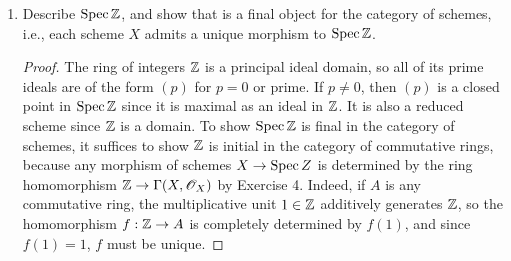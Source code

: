 \documentclass{article}
\begin{document}
\begin{enumerate} [label=\textbf{\arabic*.}, leftmargin=0em]
\begin{proof}
    We want to show the homomorphism between global sections $A \to \Gamma(X, \fO_X)$ completely determines the morphism $f : X \to \spec{B}$. We can check this locally on $X$. Let $V = \spec{B}$ be an open affine subset of $X$. We also have a homomorphism of global sections $A \to \Gamma(V, \fO_X) = B$ by composing with the inclusion morphism, which fits into the following commutative diagram
    \[ \begin{tikzcd}
        & {\Gamma(X, \fO_X)} \arrow[rd] &                               \\
A \arrow[ru] \arrow[rr] &                               & {\Gamma(\spec{B}, \fO_X) = B}
    \end{tikzcd} \]
    where $\Gamma(X, \fO_X) \to B$ is the natural restriction homomorphism. By equivalence of the category of rings and affine schemes, we conclude that $\alpha$ is injective.

    It remains to show $\alpha$ is surjective. Let $\varphi : A \to \Gamma(X, \fO_X)$ be a homomorphism of global sections. For each $x \in X$, let $\goth{m}_x$ be the maximal ideal of $\fO_{x, X}$, and let $i_x : \Gamma(X, \fO_X) \to \fO_{x, X}$ be the natural map. Then define $\tilde{\varphi} : X \to \spec{A}$ by $x \mapsto (i_x \circ \varphi)^{-1}(\goth{m}_x)$. This coincides with the case when $X$ is affine. Indeed, suppose $X = \spec{B}$ for some ring $B$, and let $\goth{p} \in \spec{B}$ corresponding to $x$. The inclusion homeomorphism $i_x : \Gamma(X, \fO_X) \to \fO_{x, X}$ is precisely the natural map $i_\goth{p} : B \to B_\goth{p}$ associated to localization. Thus, $i_x(\gm_x) = \goth{p} \in B$, and $\tilde{\varphi}(x) = \varphi^{-1}(\goth{p})$.
\end{proof}

\item Describe $\operatorname{Spec}{\mathbb{Z}}$, and show that is a final object for the category of schemes, i.e., each scheme $X$ admits a unique morphism to $\operatorname{Spec}{\mathbb{Z}}$.

\begin{proof}
    The ring of integers $\mathbb{Z}$ is a principal ideal domain, so all of its prime ideals are of the form $(p)$ for $p = 0$ or prime. If $p \neq 0$, then $(p)$ is a closed point in $\operatorname{Spec}{\mathbb{Z}}$ since it is maximal as an ideal in $\mathbb{Z}$. It is also a reduced scheme since $\mathbb{Z}$ is a domain. To show $\operatorname{Spec}{\mathbb{Z}}$ is final in the category of schemes, it suffices to show $\mathbb{Z}$ is initial in the category of commutative rings, because any morphism of schemes $X \to \operatorname{Spec}{Z}$ is determined by the ring homomorphism $\mathbb{Z} \to \Gamma(X, \mathscr{O}_X)$ by Exercise 4. Indeed, if $A$ is any commutative ring, the multiplicative unit $1 \in \mathbb{Z}$ additively generates $\mathbb{Z}$, so the homomorphism $f : \mathbb{Z} \to A$ is completely determined by $f(1)$, and since $f(1) = 1$, $f$ must be unique.
\end{proof}


\end{enumerate}
\end{document}
